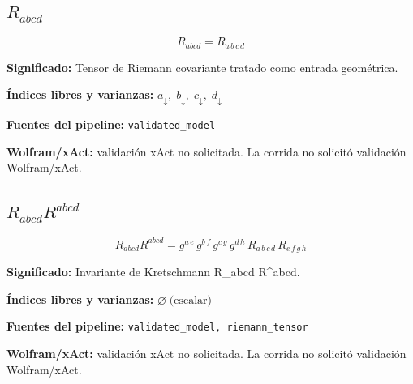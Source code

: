 \documentclass[11pt]{article}
\begin{document}
\subsection*{$ R_{abcd} $}
\begin{dmath*}[breakdepth={5}]
R_{abcd} = R{}_{a\,b\,c\,d}
\end{dmath*}
\par\vspace{1.2\baselineskip}\noindent
\begin{minipage}{\linewidth}
\textbf{Significado:} Tensor de Riemann covariante tratado como entrada geométrica.\par
\textbf{Índices libres y varianzas:} $ a_{\downarrow},\;b_{\downarrow},\;c_{\downarrow},\;d_{\downarrow} $\par
\textbf{Fuentes del pipeline:} \texttt{validated\_model}\par
\textbf{Wolfram/xAct:} validación xAct no solicitada. La corrida no solicitó validación Wolfram/xAct.\par
\end{minipage}
\subsection*{$ R_{abcd}R^{abcd} $}
\begin{dmath*}[breakdepth={5}]
R_{abcd}R^{abcd} = g{}^{a\,e}\,g{}^{b\,f}\,g{}^{c\,g}\,g{}^{d\,h}\,R{}_{a\,b\,c\,d}\,R{}_{e\,f\,g\,h}
\end{dmath*}
\par\vspace{1.2\baselineskip}\noindent
\begin{minipage}{\linewidth}
\textbf{Significado:} Invariante de Kretschmann R\_abcd R^abcd.\par
\textbf{Índices libres y varianzas:} $ \varnothing\;\text{(escalar)} $\par
\textbf{Fuentes del pipeline:} \texttt{validated\_model, riemann\_tensor}\par
\textbf{Wolfram/xAct:} validación xAct no solicitada. La corrida no solicitó validación Wolfram/xAct.\par
\end{minipage}
\end{document}
